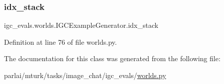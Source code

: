 \subsubsection{\texorpdfstring{idx\+\_\+stack}{idx\_stack}}
{\footnotesize\ttfamily igc\+\_\+evals.\+worlds.\+I\+G\+C\+Example\+Generator.\+idx\+\_\+stack}



Definition at line 76 of file worlds.\+py.



The documentation for this class was generated from the following file\+:\begin{DoxyCompactItemize}
\item 
parlai/mturk/tasks/image\+\_\+chat/igc\+\_\+evals/\hyperlink{parlai_2mturk_2tasks_2image__chat_2igc__evals_2worlds_8py}{worlds.\+py}\end{DoxyCompactItemize}
